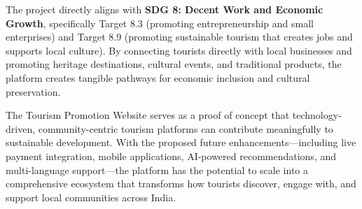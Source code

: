 The project directly aligns with \textbf{SDG 8: Decent Work and Economic Growth}, specifically Target 8.3 (promoting entrepreneurship and small enterprises) and Target 8.9 (promoting sustainable tourism that creates jobs and supports local culture). By connecting tourists directly with local businesses and promoting heritage destinations, cultural events, and traditional products, the platform creates tangible pathways for economic inclusion and cultural preservation.

The Tourism Promotion Website serves as a proof of concept that technology-driven, community-centric tourism platforms can contribute meaningfully to sustainable development. With the proposed future enhancements---including live payment integration, mobile applications, AI-powered recommendations, and multi-language support---the platform has the potential to scale into a comprehensive ecosystem that transforms how tourists discover, engage with, and support local communities across India.
